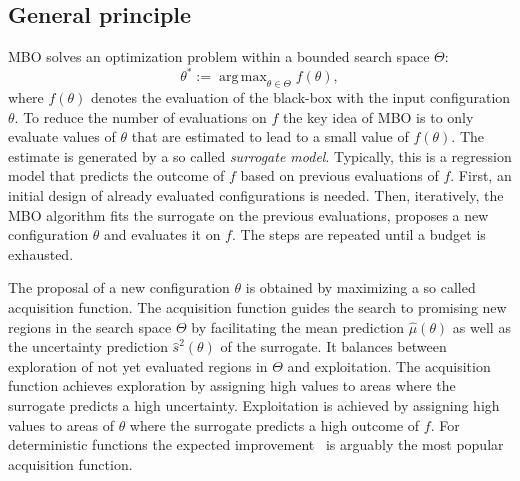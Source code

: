 \documentclass[bimj,fleqn]{w-art}
\theoremstyle{plain}
\theoremstyle{definition}
\begin{document}
\subsection{General principle}
MBO solves an optimization problem within a bounded search space $\Theta$:
\[
\theta^\ast := \operatorname{arg\,max}_{\theta \in \Theta} f(\theta),
\]
where $f(\theta)$ denotes the evaluation of the black-box with the input configuration $\theta$.
To reduce the number of evaluations on $f$ the key idea of MBO is to only evaluate values of $\theta$ that are estimated to lead to a small value of $f(\theta)$.
The estimate is generated by a so called \emph{surrogate model}.
Typically, this is a regression model that predicts the outcome of $f$ based on previous evaluations of $f$.
First, an initial design of already evaluated configurations is needed.
Then, iteratively, the MBO algorithm fits the surrogate on the previous evaluations, proposes a new configuration $\theta$ and evaluates it on $f$.
The steps are repeated until a budget is exhausted.

The proposal of a new configuration $\theta$ is obtained by maximizing a so called acquisition function.
The acquisition function guides the search to promising new regions in the search space $\Theta$ by facilitating the mean prediction $\hat{\mu}(\theta)$ as well as the uncertainty prediction $\hat{s}^2(\theta)$ of the surrogate.
It balances between exploration of not yet evaluated regions in $\Theta$ and exploitation.
The acquisition function achieves exploration by assigning high values to areas where the surrogate predicts a high uncertainty.
Exploitation is achieved by assigning high values to areas of $\theta$ where the surrogate predicts a high outcome of $f$.
For deterministic functions the expected improvement~\citep{jones_efficient_1998} is arguably the most popular acquisition function.
\end{document}
